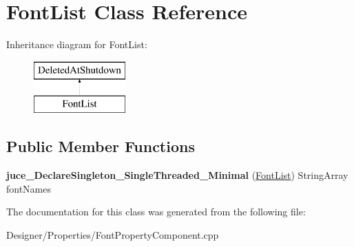 \hypertarget{class_font_list}{\section{Font\-List Class Reference}
\label{class_font_list}
}
Inheritance diagram for Font\-List\-:\begin{figure}[H]
\begin{center}
\leavevmode
\includegraphics[height=2.000000cm]{class_font_list}
\end{center}
\end{figure}
\subsection*{Public Member Functions}
\begin{DoxyCompactItemize}
\item 
\hypertarget{class_font_list_ae59193ebb75a13ceef77324e1a06e13d}{{\bfseries juce\-\_\-\-Declare\-Singleton\-\_\-\-Single\-Threaded\-\_\-\-Minimal} (\hyperlink{class_font_list}{Font\-List}) String\-Array font\-Names}\label{class_font_list_ae59193ebb75a13ceef77324e1a06e13d}

\end{DoxyCompactItemize}


The documentation for this class was generated from the following file\-:\begin{DoxyCompactItemize}
\item 
Designer/\-Properties/Font\-Property\-Component.\-cpp\end{DoxyCompactItemize}
